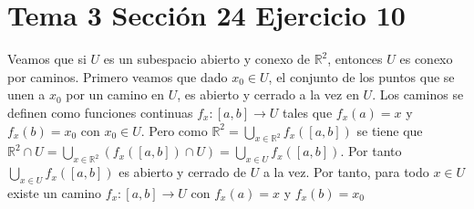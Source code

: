 \documentclass{article}
\begin{document}
\section{Tema 3 Sección 24 Ejercicio 10}
Veamos que si $U$ es un subespacio abierto y conexo de $\mathbb{R}^2$, entonces $U$ es conexo por caminos.
Primero veamos que dado $x_0\in U$, el conjunto de los puntos que se unen a $x_0$ por un camino en $U$, es abierto y cerrado a la vez en $U$. Los caminos se definen como funciones continuas $f_x:[a,b]\rightarrow U$ tales que $f_x(a)=x$ y $f_x(b)=x_0$ con $x_0\in U$. Pero como $\mathbb{R}^2= \bigcup_{x\in \mathbb{R}^2}f_x([a,b])$ se tiene que $\mathbb{R}^2\cap U=\bigcup_{x\in \mathbb{R}^2}\left(f_x([a,b])\cap U\right)=\bigcup_{x\in U}f_x([a,b])$. Por tanto  $\bigcup_{x\in U}f_x([a,b])$ es abierto  y cerrado de $U$ a la vez. Por tanto, para todo $x\in U$ existe un camino $f_x:[a,b]\rightarrow U$ con $f_x(a)=x$ y $f_x(b)=x_0$
\end{document}
